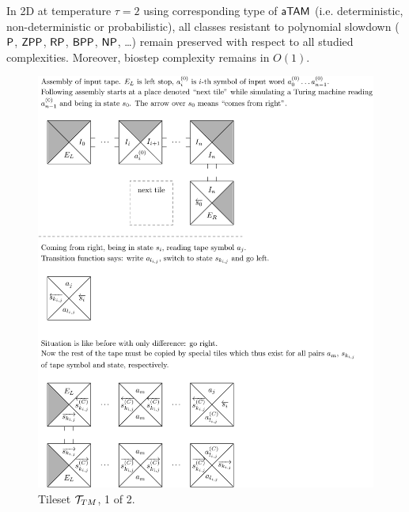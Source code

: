 	\begin{cor}
	\label{cor:poly_resist}
		
		In 2D at temperature $\tau = 2$ using corresponding type of $\atam$ (i.e. deterministic, non-deterministic or probabilistic), all classes resistant to polynomial slowdown ($\P$, $\ZPP$, $\RP$, $\BPP$, $\NP$, \ldots) remain preserved with respect to all studied complexities. Moreover, biostep complexity remains in $O(1)$.
	\end{cor}
	
	\begin{figure}[h]
	\begin{center}
		\includegraphics{./figures/turing_tiles/out1-1.pdf}
		\caption{Tileset ${\cal T}_{TM}$, 1 of 2.}
		\label{fig:tileset1}
	\end{center}
	\end{figure}
	
